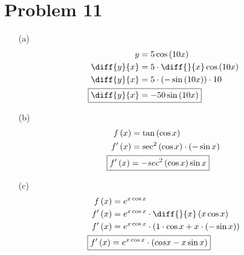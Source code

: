 \documentclass{article}
\begin{document}
\section*{Problem 11}
\begin{itemize}
\item[(a)]
    \begin{align*}
        y&=5\cos\left(10x\right) \\
        \diff{y}{x}&=5\cdot\diff{}{x}\cos\left(10x\right) \\
        \diff{y}{x}&=5\cdot\left(-\sin\left(10x\right)\right)\cdot10 \\
        \Aboxed{\diff{y}{x}&=-50\sin\left(10x\right)} \\
    \end{align*}

\item[(b)]
    \begin{align*}
        f\left(x\right)&=\tan\left(\cos x\right) \\
        f'\left(x\right)&=\sec^2\left(\cos x\right)\cdot\left(-\sin x\right) \\
        \Aboxed{f'\left(x\right)&=-sec^2\left(\cos x\right)\sin x}
    \end{align*}

\item[(c)]
    \begin{align*}
        f\left(x\right)&=e^{x\cos x} \\
        f'\left(x\right)&=e^{x\cos x}\cdot\diff{}{x}\left(x\cos x\right) \\
        f'\left(x\right)&=e^{x\cos x}\cdot\left(1\cdot\cos x+x\cdot\left(-\sin x\right)\right) \\
        \Aboxed{f'\left(x\right)&=e^{x\cos x}\cdot\left(cos x-x\sin x\right)} \\
    \end{align*}


\end{itemize}
\end{document}
